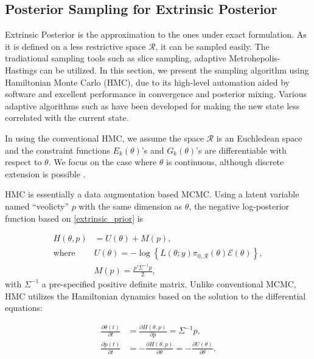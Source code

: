 \documentclass[10pt]{article}
\newcommand{\mc}[1]{\mathcal{#1}}
\begin{document}
\subsection{Posterior Sampling for Extrinsic Posterior}

Extrinsic Posterior is the approximation to the ones under exact formulation. As it is defined on a less restrictive space $\mc R$, it can be sampled easily. The tradiational sampling tools such as slice sampling, adaptive Metrohepolis-Hastings can be utilized. In this section, we present the sampling algorithm using Hamiltonian Monte Carlo (HMC), due to its high-level automation aided by software and excellent performance in convergence and posterior mixing. Various adaptive algorithms such as \cite{hoffman2014no} have been developed for making the new state less correlated with the current state.

In using the conventional HMC, we assume the space $\mc R$ is an Euchledean space and the constraint functions $E_k(\theta)$'s and $G_k(\theta)$'s  are differentiable with respect to $\theta$. We focus on the case where $\theta$ is continuous, although discrete extension is possible \citep{zhang2012continuous}.

HMC is essentially a data augmentation based MCMC. Using a latent variable named ``veolicty'' $p$ with the same dimension as $\theta$, the negative log-posterior function based on \eqref{extrinsic_prior} is

\begin{equation}
\begin{aligned}
H(\theta, p)& = U(\theta)+M(p),\\
\text{where } & U(\theta) = -\log\left\{ L(\theta;y)\pi_{0,\mc R}(\theta) \mc{E}(\theta) \right\},\\
& M(p) = \frac{p'\Sigma^{-1} p}{2},\end{aligned}
\end{equation}
with $\Sigma^{-1}$ a pre-specified positive definite matrix. Unlike conventional MCMC, HMC utilizes the Hamiltonian dynamics based on the solution to the differential equations:

\begin{equation}
\begin{aligned}
\label{hamiltonian}
\frac{\partial \theta (t)}{\partial t} & =\frac{\partial H(\theta, p)}{\partial p} = \Sigma^{-1}p,\\
\frac{\partial p(t)}{\partial t}& =-\frac{\partial H(\theta, p)}{\partial \theta} = -\frac{\partial U(\theta)}{\partial \theta}.
\end{aligned}
\end{equation}
\end{document}
